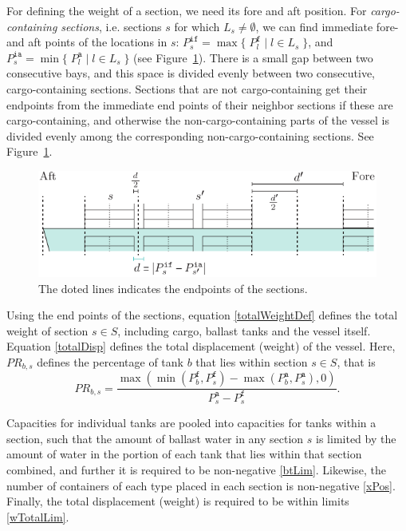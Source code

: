 \documentclass[citeauthoryear]{llncs}
\newcommand{\trt}[1]{\texttt{#1}}
\newcommand{\mi}{\mathit}
\newcommand{\set}[2]{\{\;{#1}\;|\;{#2}\;\}}
\begin{document}
For defining the weight of a section, we need its fore and aft position. For \emph{cargo-containing sections}, i.e. sections $s$ for which $L_s\neq \emptyset$, we can find immediate fore- and aft points of the locations in $s$: $P^\trt{if}_s = \max\set{P^\trt{f}_l}{l\in L_s}$, and $P^\trt{ia}_s = \min\set{P^\trt{a}_l}{l\in L_s}$ (see Figure~\ref{fig:sections}). There is a small gap between two consecutive bays, and this space is divided evenly between two consecutive, cargo-containing sections. Sections that are not cargo-containing get their endpoints from the immediate end points of their neighbor sections if these are cargo-containing, and otherwise the non-cargo-containing parts of the vessel is divided evenly among the corresponding non-cargo-containing sections. See Figure~\ref{fig:sections}.
\begin{figure}[htbp]
	\centering
		\includegraphics{figures/sections.pdf}
	\caption{The doted lines indicates the endpoints of the sections.}
	\label{fig:sections}
\end{figure}
Using the end points of the sections, equation \eqref{totalWeightDef} defines the total weight of section $s\in S$, including cargo, ballast tanks and the vessel itself. Equation \eqref{totalDisp} defines the total displacement (weight) of the vessel.  Here, $\mi{PR}_{b,s}$ defines the percentage of tank $b$ that lies within section $s\in S$, that is 
\[
\mi{PR}_{b,s} = \frac{\max(\min(P^\texttt{f}_b, P^\texttt{f}_s)-\max(P^\texttt{a}_b, P^\texttt{a}_s),0)}{P^\texttt{a}_s-P^\texttt{f}_s}.
\]

Capacities for individual tanks are pooled into capacities for tanks within a section, such that the amount of ballast water in any section $s$ is limited by the amount of water in the portion of each tank that lies within that section combined, and further it is required to be non-negative \eqref{btLim}. Likewise, the number of containers of each type placed in each section is non-negative \eqref{xPos}. Finally, the total displacement (weight) is required to be within limits \eqref{wTotalLim}.
\end{document}
